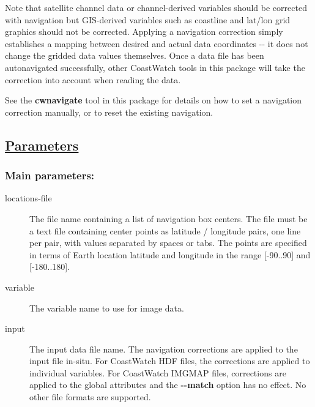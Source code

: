  Note that satellite channel data or channel-derived variables should be corrected with navigation but GIS-derived variables such as coastline and lat/lon grid graphics should not be corrected. Applying a navigation correction simply establishes a mapping between desired and actual data coordinates -{-} it does not change the gridded data values themselves. Once a data file has been autonavigated successfully, other CoastWatch tools in this package will take the correction into account when reading the data.


 See the \textbf{cwnavigate}
 tool in this package for details on how to set a navigation correction manually, or to reset the existing navigation.
\subsection*{\underline{Parameters}}
\subsubsection*{Main parameters:}
\begin{description}
\item[ locations-file ] The file name containing a list of navigation box centers. The file must be a text file containing center points as latitude / longitude pairs, one line per pair, with values separated by spaces or tabs. The points are specified in terms of Earth location latitude and longitude in the range [-90..90] and [-180..180]. 
\item[ variable ] The variable name to use for image data. 
\item[ input ] The input data file name. The navigation corrections are applied to the input file in-situ. For CoastWatch HDF files, the corrections are applied to individual variables. For CoastWatch IMGMAP files, corrections are applied to the global attributes and the \textbf{-{-}match}
 option has no effect. No other file formats are supported.

\end{description}
